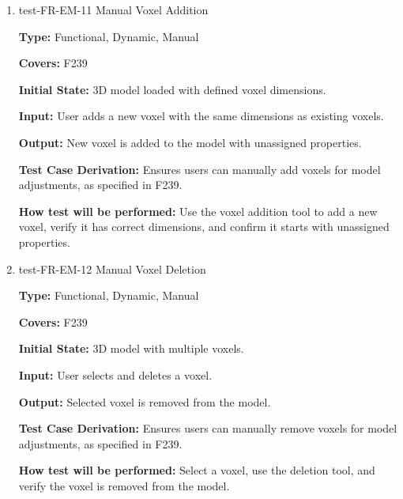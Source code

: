 \documentclass[12pt, titlepage]{article}
\begin{document}
\begin{enumerate}
\textbf{Input:} User selects an entire layer and assigns common material and magnetization properties.
					
\textbf{Output:} All voxels in the selected layer receive the assigned properties.

\textbf{Test Case Derivation:} Validates efficient bulk operations by allowing entire layer selection, per F238.
					
\textbf{How test will be performed:} Select an entire layer, assign material and magnetization properties, and verify all voxels in the layer receive the assignments.

\item{test-FR-EM-11 Manual Voxel Addition\\}
\label{sec:t-em-11}

\textbf{Type:} Functional, Dynamic, Manual

\textbf{Covers:} F239
					
\textbf{Initial State:} 3D model loaded with defined voxel dimensions.
					
\textbf{Input:} User adds a new voxel with the same dimensions as existing voxels.
					
\textbf{Output:} New voxel is added to the model with unassigned properties.

\textbf{Test Case Derivation:} Ensures users can manually add voxels for model adjustments, as specified in F239.
					
\textbf{How test will be performed:} Use the voxel addition tool to add a new voxel, verify it has correct dimensions, and confirm it starts with unassigned properties.

\item{test-FR-EM-12 Manual Voxel Deletion\\}
\label{sec:t-em-12}

\textbf{Type:} Functional, Dynamic, Manual

\textbf{Covers:} F239
					
\textbf{Initial State:} 3D model with multiple voxels.
					
\textbf{Input:} User selects and deletes a voxel.
					
\textbf{Output:} Selected voxel is removed from the model.

\textbf{Test Case Derivation:} Ensures users can manually remove voxels for model adjustments, as specified in F239.
					
\textbf{How test will be performed:} Select a voxel, use the deletion tool, and verify the voxel is removed from the model.


\end{enumerate}
\end{document}
